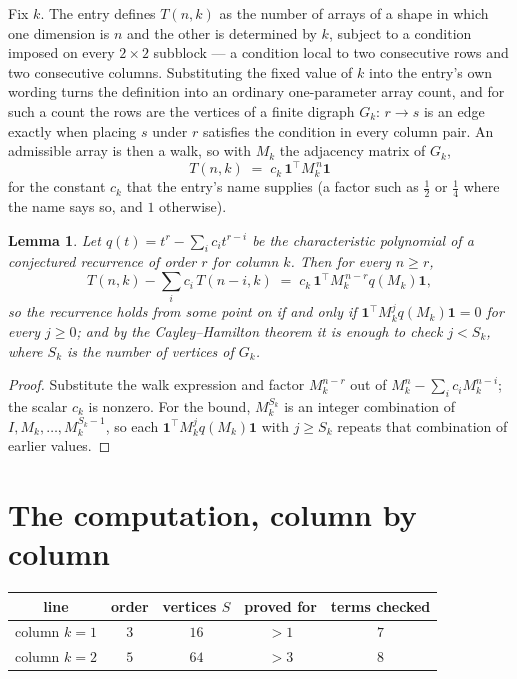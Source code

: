 \documentclass[11pt,a4paper]{article}
\theoremstyle{plain}
\newtheorem{lemma}[theorem]{Lemma}
\theoremstyle{definition}
\begin{document}
Fix $k$. The entry defines $T(n,k)$ as the number of arrays of a shape in which one dimension
is $n$ and the other is determined by $k$, subject to a condition imposed on every
$2\times2$ subblock --- a condition local to two consecutive rows and two consecutive columns.
Substituting the fixed value of $k$ into the entry's own wording turns the definition into an
ordinary one-parameter array count, and for such a count the rows are the vertices of a finite
digraph $G_k$: $r\to s$ is an edge exactly when placing $s$ under $r$ satisfies the condition
in every column pair. An admissible array is then a walk, so with $M_k$ the adjacency matrix
of $G_k$,
\[
T(n,k)\;=\;c_k\,\mathbf{1}^{\!\top}M_k^{\,n}\mathbf{1}
\]
for the constant $c_k$ that the entry's name supplies (a factor such as $\tfrac12$ or
$\tfrac14$ where the name says so, and $1$ otherwise).

\begin{lemma}\label{lem:crit}
Let $q(t)=t^{r}-\sum_i c_it^{r-i}$ be the characteristic polynomial of a conjectured
recurrence of order $r$ for column $k$. Then for every $n\ge r$,
\[
T(n,k)-\sum_i c_i\,T(n-i,k)\;=\;c_k\,\mathbf{1}^{\!\top}M_k^{\,n-r}q(M_k)\mathbf{1},
\]
so the recurrence holds from some point on if and only if
$\mathbf{1}^{\!\top}M_k^{j}q(M_k)\mathbf{1}=0$ for every $j\ge0$; and by the
Cayley--Hamilton theorem it is enough to check $j<S_k$, where $S_k$ is the number of vertices
of $G_k$.
\end{lemma}

\begin{proof}
Substitute the walk expression and factor $M_k^{n-r}$ out of $M_k^{n}-\sum_ic_iM_k^{n-i}$;
the scalar $c_k$ is nonzero. For the bound, $M_k^{S_k}$ is an integer combination of
$I,M_k,\dots,M_k^{S_k-1}$, so each $\mathbf{1}^{\!\top}M_k^{j}q(M_k)\mathbf{1}$ with
$j\ge S_k$ repeats that combination of earlier values.
\end{proof}

\section{The computation, column by column}

\begin{center}
\begin{tabular}{ccccc}
line & order & vertices $S$ & proved for & terms checked \\ \hline
column $k$$=1$ & $3$ & $16$ & $>1$ & $7$ \\
column $k$$=2$ & $5$ & $64$ & $>3$ & $8$ \\
\end{tabular}
\end{center}
\end{document}
